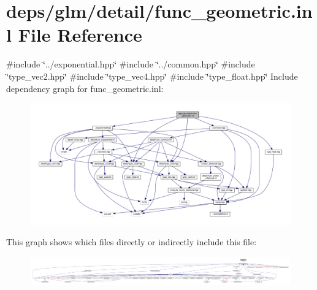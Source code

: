 \hypertarget{func__geometric_8inl}{}\section{deps/glm/detail/func\+\_\+geometric.inl File Reference}
\label{func__geometric_8inl}
{\ttfamily \#include \char`\"{}../exponential.\+hpp\char`\"{}}\newline
{\ttfamily \#include \char`\"{}../common.\+hpp\char`\"{}}\newline
{\ttfamily \#include \char`\"{}type\+\_\+vec2.\+hpp\char`\"{}}\newline
{\ttfamily \#include \char`\"{}type\+\_\+vec4.\+hpp\char`\"{}}\newline
{\ttfamily \#include \char`\"{}type\+\_\+float.\+hpp\char`\"{}}\newline
Include dependency graph for func\+\_\+geometric.\+inl\+:
\nopagebreak
\begin{figure}[H]
\begin{center}
\leavevmode
\includegraphics[width=350pt]{dc/d06/func__geometric_8inl__incl}
\end{center}
\end{figure}
This graph shows which files directly or indirectly include this file\+:
\nopagebreak
\begin{figure}[H]
\begin{center}
\leavevmode
\includegraphics[width=350pt]{d5/dfc/func__geometric_8inl__dep__incl}
\end{center}
\end{figure}
